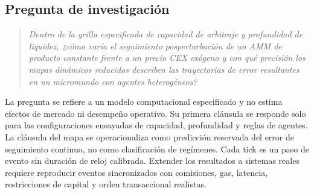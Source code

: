 \FloatBarrier
\begin{samepage}
\section{Pregunta de investigación}

\begin{quote}
\emph{Dentro de la grilla especificada de capacidad de arbitraje y profundidad de liquidez, ¿cómo varía el seguimiento posperturbación de un AMM de producto constante frente a un precio CEX exógeno y con qué precisión los mapas dinámicos reducidos describen las trayectorias de error resultantes en un micromundo con agentes heterogéneos?}
\end{quote}
\end{samepage}

La pregunta se refiere a un modelo computacional especificado y no estima efectos de mercado ni desempeño operativo. Su primera cláusula se responde solo para las configuraciones ensayadas de capacidad, profundidad y reglas de agentes. La cláusula del mapa se operacionaliza como predicción reservada del error de seguimiento continuo, no como clasificación de regímenes. Cada tick es un paso de evento sin duración de reloj calibrada. Extender los resultados a sistemas reales requiere reproducir eventos sincronizados con comisiones, gas, latencia, restricciones de capital y orden transaccional realistas.
